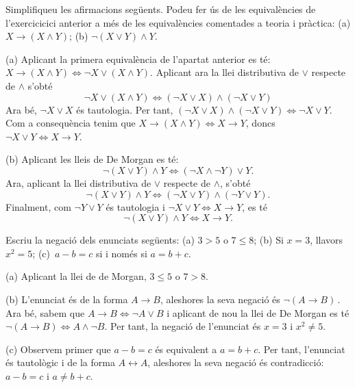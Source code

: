 \begin{exercici}
Simplifiqueu les afirmacions seg\"{u}ents. Podeu fer \'{u}s de les
equival\`{e}ncies de l'exercicicici anterior a m\'{e}s de les equival\`{e}ncies
comentades a teoria i pr\`{a}ctica: (a) $X\longrightarrow\left(  X\wedge
Y\right)  $; (b) $\lnot\left(  X\vee Y\right)  \wedge Y$.
\end{exercici}

\begin{solucio}
(a) Aplicant la primera equival\`{e}ncia de l'apartat anterior es t\'{e}:
$X\longrightarrow\left(  X\wedge Y\right)  \Longleftrightarrow\lnot
X\vee\left(  X\wedge Y\right)  $. Aplicant ara la llei distributiva de $\vee$
respecte de $\wedge$ s'obt\'{e}%
\[
\lnot X\vee\left(  X\wedge Y\right)  \Longleftrightarrow\left(  \lnot X\vee
X\right)  \wedge\left(  \lnot X\vee Y\right)
\]
Ara b\'{e}, $\lnot X\vee X$ \'{e}s tautologia. Per tant, $\left(  \lnot X\vee
X\right)  \wedge\left(  \lnot X\vee Y\right)  \Longleftrightarrow\lnot X\vee Y
$. Com a consequ\`{e}ncia tenim que $X\longrightarrow\left(  X\wedge Y\right)
\Longleftrightarrow X\longrightarrow Y$, doncs $\lnot X\vee
Y\Longleftrightarrow X\longrightarrow Y$.

(b) Aplicant les lleis de De Morgan es t\'{e}:%
\[
\lnot\left(  X\vee Y\right)  \wedge Y\Longleftrightarrow\left(  \lnot
X\wedge\lnot Y\right)  \vee Y.
\]
Ara, aplicant la llei distributiva de $\vee$ respecte de $\wedge$, s'obt\'{e}
\[
\lnot\left(  X\vee Y\right)  \wedge Y\Longleftrightarrow\left(  \lnot X\vee
Y\right)  \wedge\left(  \lnot Y\vee Y\right)  .
\]
Finalment, com $\lnot Y\vee Y$ \'{e}s tautologia i $\lnot X\vee
Y\Longleftrightarrow X\longrightarrow Y$, es t\'{e}%
\[
\lnot\left(  X\vee Y\right)  \wedge Y\Longleftrightarrow X\longrightarrow
Y\text{.}%
\]

\end{solucio}

\begin{exercici}
Escriu la negaci\'{o} dels enunciats seg\"{u}ents: (a) $3>5$ o $7\leq8$; (b)
Si $x=3$, llavors $x^{2}=5$; (c)\ $a-b=c$ si i nom\'{e}s si $a=b+c$.
\end{exercici}

\begin{solucio}
(a) Aplicant la llei de de Morgan, $3\leq5$ o $7>8$.

(b) L'enunciat \'{e}s de la forma $A\longrightarrow B$, aleshores la seva
negaci\'{o} \'{e}s $\lnot\left(  A\longrightarrow B\right)  \,$. Ara b\'{e},
sabem que $A\longrightarrow B\Longleftrightarrow\lnot A\vee B$ i aplicant de
nou la llei de De Morgan es t\'{e} $\lnot\left(  A\longrightarrow B\right)
\Longleftrightarrow A\wedge\lnot B$. Per tant, la negaci\'{o} de l'enunciat
\'{e}s $x=3$ i $x^{2}\neq5$.

(c) Observem primer que $a-b=c$ \'{e}s equivalent a $a=b+c$. Per tant,
l'enunciat \'{e}s tautol\`{o}gic i de la forma $A\longleftrightarrow A$,
aleshores la seva negaci\'{o} \'{e}s contradicci\'{o}: $a-b=c$ i $a\neq b+c$.
\end{solucio}

